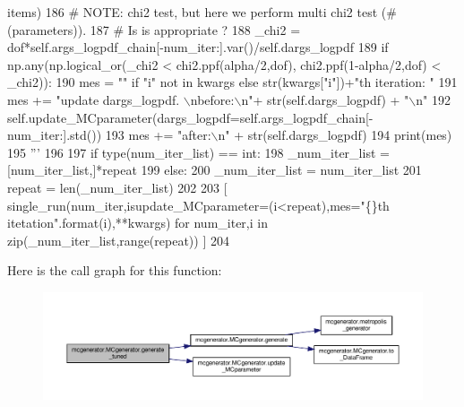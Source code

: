 \begin{DoxyCode}
{       items)}
186 \textcolor{stringliteral}{                # NOTE: chi2 test, but here we perform multi chi2 test (#(parameters)).}
187 \textcolor{stringliteral}{                #       Is is appropriate ?}
188 \textcolor{stringliteral}{                \_chi2 = dof*self.args\_logpdf\_chain[-num\_iter:].var()/self.dargs\_logpdf}
189 \textcolor{stringliteral}{                if np.any(np.logical\_or(\_chi2 < chi2.ppf(alpha/2,dof), chi2.ppf(1-alpha/2,dof) < \_chi2)):}
190 \textcolor{stringliteral}{                    mes = "" if "i" not in kwargs else str(kwargs["i"])+"th iteration: "}
191 \textcolor{stringliteral}{                    mes += "update dargs\_logpdf. \(\backslash\)nbefore:\(\backslash\)n"+ str(self.dargs\_logpdf) + "\(\backslash\)n"}
192 \textcolor{stringliteral}{                    self.update\_MCparameter(dargs\_logpdf=self.args\_logpdf\_chain[-num\_iter:].std())}
193 \textcolor{stringliteral}{                    mes += "after:\(\backslash\)n" + str(self.dargs\_logpdf)}
194 \textcolor{stringliteral}{                    print(mes)}
195 \textcolor{stringliteral}{                '''}
196 
197         \textcolor{keywordflow}{if} type(num\_iter\_list) == int:
198             \_num\_iter\_list = [num\_iter\_list,]*repeat
199         \textcolor{keywordflow}{else}:
200             \_num\_iter\_list = num\_iter\_list
201             repeat = len(\_num\_iter\_list)
202         
203         [ single\_run(num\_iter,isupdate\_MCparameter=(i<repeat),mes=\textcolor{stringliteral}{"\{\}th itetation"}.format(i),**kwargs) \textcolor{keywordflow}{for} 
      num\_iter,i \textcolor{keywordflow}{in} zip(\_num\_iter\_list,range(repeat)) ]
204 
\end{DoxyCode}
Here is the call graph for this function\+:\nopagebreak
\begin{figure}[H]
\begin{center}
\leavevmode
\includegraphics[width=350pt]{d3/dad/classmcgenerator_1_1MCgenerator_ad6c5b6846464112f7ade3d6ca197e6d2_cgraph}
\end{center}
\end{figure}
\mbox{\label{classmcgenerator_1_1MCgenerator_adfd3a69e271b805a3fa48d6b3f14b0f5}} 
